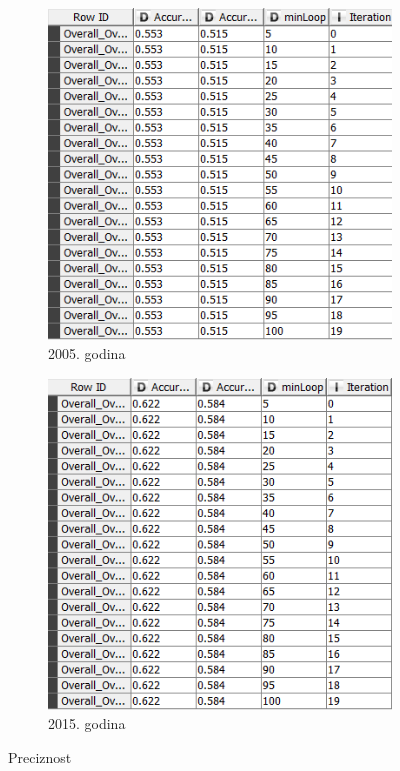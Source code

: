 \documentclass[a4paper]{article}
\begin{document}
\begin{figure}
	\begin{subfigure}[h]{\textwidth}
		\begin{center}
			\includegraphics[scale=0.75]{Klasifikacija/DrvoOdlucivanja/2005/Preciznost.png}
		\end{center}
		\caption{2005. godina}
		\label{fig:Preciznost2005}
	\end{subfigure}

	\vspace{0.5cm}
	\begin{subfigure}[h]{\textwidth}
		\begin{center}
			\includegraphics[scale=0.75]{Klasifikacija/DrvoOdlucivanja/2015/Preciznost.png}
		\end{center}
		\caption{2015. godina}
		\label{fig:Preciznost2015}
	\end{subfigure}
	
	\caption{Preciznost}
	\label{fig:PreciznostKNIME}
\end{figure}
\end{document}
